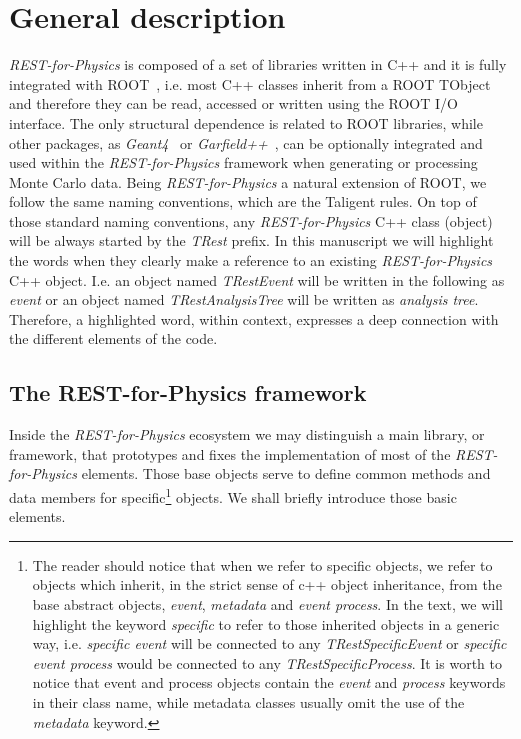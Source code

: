 \section{General description}
\label{sec:framework}



\emph{REST-for-Physics} is composed of a set of libraries written in C++ and it is fully integrated with ROOT~\cite{ROOT}, i.e. most C++ classes inherit from a ROOT TObject and therefore they can be read, accessed or written using the ROOT I/O interface. The only structural dependence is related to ROOT libraries, while other packages, as \emph{Geant4}~\cite{Agostinelli:2002hh} or \emph{Garfield++}~\cite{Garfield}, can be optionally integrated and used within the \emph{REST-for-Physics} framework when generating or processing Monte Carlo data. Being \emph{REST-for-Physics} a natural extension of ROOT, we follow the same naming conventions, which are the Taligent rules. On top of those standard naming conventions, any \emph{REST-for-Physics} C++ class (object) will be always started by the \emph{TRest} prefix. In this manuscript we will highlight the words when they clearly make a reference to an existing \emph{REST-for-Physics} C++ object. I.e. an object named \emph{TRestEvent} will be written in the following as \emph{event} or an object named \emph{TRestAnalysisTree} will be written as \emph{analysis tree}. Therefore, a highlighted word, within context, expresses a deep connection with the different elements of the code.

\subsection{The REST-for-Physics framework}
Inside the \emph{REST-for-Physics} ecosystem we may distinguish a main library, or framework, that prototypes and fixes the implementation of most of the \emph{REST-for-Physics} elements. Those base objects serve to define common methods and data members for specific\footnote{The reader should notice that when we refer to specific objects, we refer to objects which inherit, in the strict sense of c++ object inheritance, from the base abstract objects, \emph{event}, \emph{metadata} and \emph{event process}. In the text, we will highlight the keyword \emph{specific} to refer to those inherited objects in a generic way, i.e. \emph{specific event} will be connected to any \emph{TRestSpecificEvent} or \emph{specific event process} would be connected to any \emph{TRestSpecificProcess}. It is worth to notice that event and process objects contain the \emph{event} and \emph{process} keywords in their class name, while metadata classes usually omit the use of the \emph{metadata} keyword. } objects. We shall briefly introduce those basic elements.

